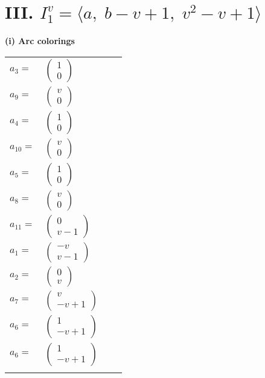 \documentclass[1p]{elsarticle_modified}
\theoremstyle{definition}
\begin{document}
\centering \section*{III. $I^v_{1}= \langle a,\;b- v+1,\;v^2- v+1 \rangle$}
\flushleft \textbf{(i) Arc colorings}\\
\begin{tabular}{m{7pt} m{180pt} m{7pt} m{180pt} }
\flushright $a_{3}=$&$\begin{pmatrix}1\\0\end{pmatrix}$ \\
\flushright $a_{9}=$&$\begin{pmatrix}v\\0\end{pmatrix}$ \\
\flushright $a_{4}=$&$\begin{pmatrix}1\\0\end{pmatrix}$ \\
\flushright $a_{10}=$&$\begin{pmatrix}v\\0\end{pmatrix}$ \\
\flushright $a_{5}=$&$\begin{pmatrix}1\\0\end{pmatrix}$ \\
\flushright $a_{8}=$&$\begin{pmatrix}v\\0\end{pmatrix}$ \\
\flushright $a_{11}=$&$\begin{pmatrix}0\\v-1\end{pmatrix}$ \\
\flushright $a_{1}=$&$\begin{pmatrix}- v\\v-1\end{pmatrix}$ \\
\flushright $a_{2}=$&$\begin{pmatrix}0\\v\end{pmatrix}$ \\
\flushright $a_{7}=$&$\begin{pmatrix}v\\- v+1\end{pmatrix}$ \\
\flushright $a_{6}=$&$\begin{pmatrix}1\\- v+1\end{pmatrix}$\\ \flushright $a_{6}=$&$\begin{pmatrix}1\\- v+1\end{pmatrix}$\\&\end{tabular}
\end{document}
